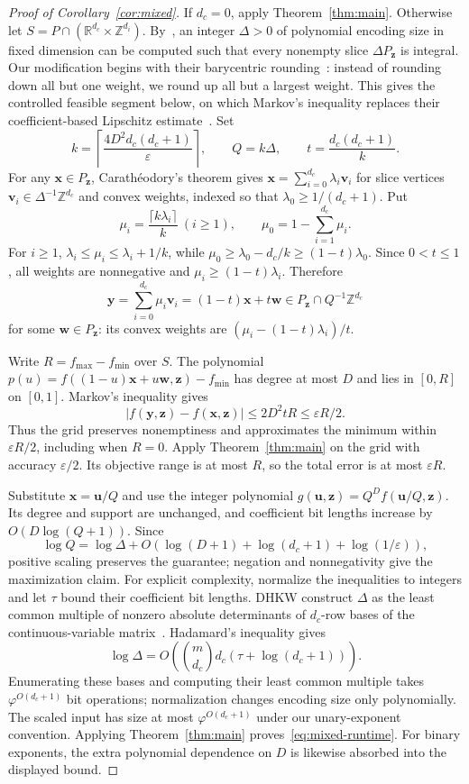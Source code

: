 \documentclass[11pt]{article}
\theoremstyle{definition}\newtheorem{definition}{Definition}[section]
\theoremstyle{remark}\newtheorem{remark}[theorem]{Remark}
\newcommand{\R}{\mathbb R}\newcommand{\Q}{\mathbb Q}\newcommand{\Z}{\mathbb Z}
\newcommand{\eps}{\varepsilon}
\begin{document}
\begin{proof}[Proof of Corollary~\ref{cor:mixed}]
If $d_c=0$, apply Theorem~\ref{thm:main}. Otherwise let $S=P\cap(\R^{d_c}\times\Z^{d_i})$. By~\cite[Lemma~9]{DHKW08}, an integer $\Delta>0$ of polynomial encoding size in fixed dimension can be computed such that every nonempty slice $\Delta P_{\mathbf z}$ is integral. Our modification begins with their barycentric rounding~\cite[Lemma~10]{DHKW08}: instead of rounding down all but one weight, we round up all but a largest weight. This gives the controlled feasible segment below, on which Markov's inequality replaces their coefficient-based Lipschitz estimate~\cite[Lemma~11]{DHKW08}. Set
\[
 k=\left\lceil\frac{4D^2d_c(d_c+1)}{\eps}\right\rceil,
 \qquad Q=k\Delta,\qquad t=\frac{d_c(d_c+1)}k.
\]
For any $\mathbf x\in P_{\mathbf z}$, Carath\'eodory's theorem gives $\mathbf x=\sum_{i=0}^{d_c}\lambda_i\mathbf v_i$ for slice vertices $\mathbf v_i\in\Delta^{-1}\Z^{d_c}$ and convex weights, indexed so that $\lambda_0\ge1/(d_c+1)$. Put
\[
 \mu_i=\frac{\lceil k\lambda_i\rceil}{k}\ (i\ge1),
 \qquad \mu_0=1-\sum_{i=1}^{d_c}\mu_i.
\]
For $i\ge1$, $\lambda_i\le\mu_i\le\lambda_i+1/k$, while
$\mu_0\ge\lambda_0-d_c/k\ge(1-t)\lambda_0$. Since $0<t\le1$, all weights are nonnegative and $\mu_i\ge(1-t)\lambda_i$. Therefore
\[
 \mathbf y=\sum_{i=0}^{d_c}\mu_i\mathbf v_i
 =(1-t)\mathbf x+t\mathbf w\in P_{\mathbf z}\cap Q^{-1}\Z^{d_c}
\]
for some $\mathbf w\in P_{\mathbf z}$: its convex weights are $(\mu_i-(1-t)\lambda_i)/t$.

Write $R=f_{\max}-f_{\min}$ over $S$. The polynomial
$p(u)=f((1-u)\mathbf x+u\mathbf w,\mathbf z)-f_{\min}$ has degree at most $D$ and lies in $[0,R]$ on $[0,1]$. Markov's inequality gives
\[
 |f(\mathbf y,\mathbf z)-f(\mathbf x,\mathbf z)|
 \le2D^2tR\le\eps R/2.
\]
Thus the grid preserves nonemptiness and approximates the minimum within $\eps R/2$, including when $R=0$. Apply Theorem~\ref{thm:main} on the grid with accuracy $\eps/2$. Its objective range is at most $R$, so the total error is at most $\eps R$.

Substitute $\mathbf x=\mathbf u/Q$ and use the integer polynomial $g(\mathbf u,\mathbf z)=Q^D f(\mathbf u/Q,\mathbf z)$. Its degree and support are unchanged, and coefficient bit lengths increase by $O(D\log(Q+1))$. Since
\[
 \log Q=\log\Delta+
 O\!\left(\log(D+1)+\log(d_c+1)+\log(1/\eps)\right),
\]
positive scaling preserves the guarantee; negation and nonnegativity give the maximization claim. For explicit complexity, normalize the inequalities to integers and let $\tau$ bound their coefficient bit lengths. DHKW construct $\Delta$ as the least common multiple of nonzero absolute determinants of $d_c$-row bases of the continuous-variable matrix~\cite[proof of Lemma~9]{DHKW08}. Hadamard's inequality gives
\[
 \log\Delta=O\!\left(\binom{m}{d_c} d_c(\tau+\log(d_c+1))\right).
\]
Enumerating these bases and computing their least common multiple takes $\varphi^{O(d_c+1)}$ bit operations; normalization changes encoding size only polynomially. The scaled input has size at most $\varphi^{O(d_c+1)}$ under our unary-exponent convention. Applying Theorem~\ref{thm:main} proves~\eqref{eq:mixed-runtime}. For binary exponents, the extra polynomial dependence on $D$ is likewise absorbed into the displayed bound.


\end{proof}
\end{document}
